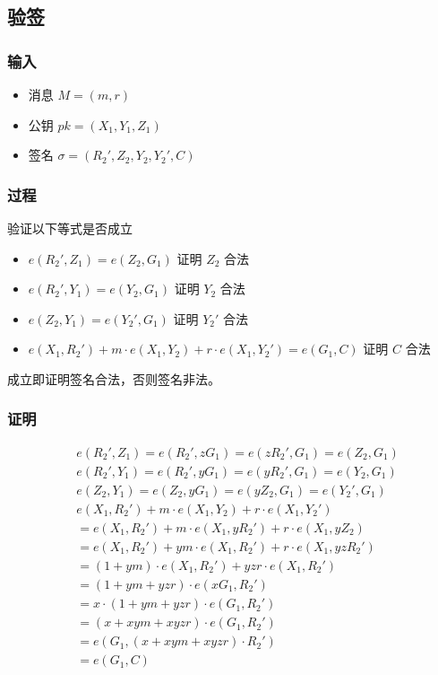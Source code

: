 \documentclass[a4paper,10pt]{article}
\begin{document}
\subsection{验签}
\subsubsection{输入}
\begin{itemize}
  \item 消息 \(M=(m,r)\)
  \item 公钥 \(pk=(X_1,Y_1,Z_1)\)
  \item 签名 \(\sigma=(R_2',Z_2,Y_2,Y_2',C)\)
\end{itemize}

\subsubsection{过程}
验证以下等式是否成立
\begin{itemize}
  \item \(e(R_2',Z_1)=e(Z_2,G_1)\) 证明 \(Z_2\) 合法
  \item \(e(R_2',Y_1)=e(Y_2,G_1)\) 证明 \(Y_2\) 合法
  \item \(e(Z_2,Y_1)=e(Y_2',G_1)\) 证明 \(Y_2'\) 合法
  \item \(e(X_1,R_2')+m\cdot e(X_1,Y_2)+r\cdot e(X_1,Y_2')=e(G_1,C)\) 证明 \(C\) 合法
\end{itemize}

成立即证明签名合法，否则签名非法。

\subsubsection{证明}
\begin{align*}
  & e(R_2',Z_1) = e(R_2',zG_1) = e(zR_2',G_1) = e(Z_2,G_1) \\
  & e(R_2',Y_1) = e(R_2',yG_1) = e(yR_2',G_1) = e(Y_2,G_1) \\
  & e(Z_2,Y_1) = e(Z_2,yG_1) = e(yZ_2,G_1) = e(Y_2',G_1)   \\
  & e(X_1,R_2')+m\cdot e(X_1,Y_2)+r\cdot e(X_1,Y_2') \\
  &= e(X_1,R_2')+m\cdot e(X_1,yR_2')+r\cdot e(X_1,yZ_2) \\
  &= e(X_1,R_2')+ym\cdot e(X_1,R_2')+r\cdot e(X_1,yzR_2') \\
  &= (1+ym)\cdot e(X_1,R_2')+yzr\cdot e(X_1,R_2') \\
  &= (1+ym+yzr)\cdot e(xG_1,R_2') \\
  &= x\cdot(1+ym+yzr)\cdot e(G_1,R_2') \\
  &= (x+xym+xyzr)\cdot e(G_1,R_2') \\
  &= e(G_1,(x+xym+xyzr)\cdot R_2') \\
  &= e(G_1,C)
\end{align*}
\end{document}
